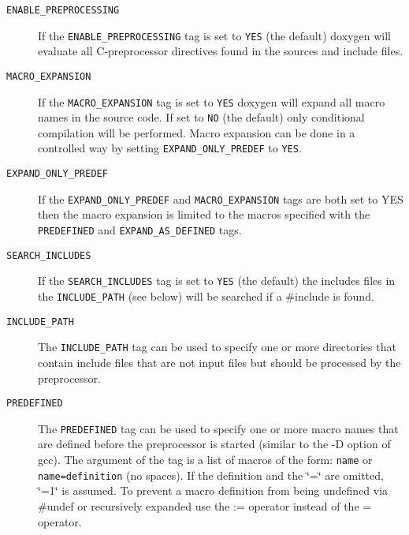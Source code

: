 \label{config_cfg_enable_preprocessing}
\hypertarget{config_cfg_enable_preprocessing}{}
 \begin{description}
\item[{\tt ENABLE\_\-PREPROCESSING} ] If the {\tt ENABLE\_\-PREPROCESSING} tag is set to {\tt YES} (the default) doxygen will evaluate all C-preprocessor directives found in the sources and include files.

\label{config_cfg_macro_expansion}
\hypertarget{config_cfg_macro_expansion}{}
 \item[{\tt MACRO\_\-EXPANSION} ] If the {\tt MACRO\_\-EXPANSION} tag is set to {\tt YES} doxygen will expand all macro names in the source code. If set to {\tt NO} (the default) only conditional compilation will be performed. Macro expansion can be done in a controlled way by setting {\tt EXPAND\_\-ONLY\_\-PREDEF} to {\tt YES}.

\label{config_cfg_expand_only_predef}
\hypertarget{config_cfg_expand_only_predef}{}
 \item[{\tt EXPAND\_\-ONLY\_\-PREDEF} ] If the {\tt EXPAND\_\-ONLY\_\-PREDEF} and {\tt MACRO\_\-EXPANSION} tags are both set to YES then the macro expansion is limited to the macros specified with the {\tt PREDEFINED} and {\tt EXPAND\_\-AS\_\-DEFINED} tags.

\label{config_cfg_search_includes}
\hypertarget{config_cfg_search_includes}{}
 \item[{\tt SEARCH\_\-INCLUDES} ] If the {\tt SEARCH\_\-INCLUDES} tag is set to {\tt YES} (the default) the includes files in the {\tt INCLUDE\_\-PATH} (see below) will be searched if a \#include is found.

\label{config_cfg_include_path}
\hypertarget{config_cfg_include_path}{}
 \item[{\tt INCLUDE\_\-PATH} ] The {\tt INCLUDE\_\-PATH} tag can be used to specify one or more directories that contain include files that are not input files but should be processed by the preprocessor.

\label{config_cfg_predefined}
\hypertarget{config_cfg_predefined}{}
 \item[{\tt PREDEFINED} ] The {\tt PREDEFINED} tag can be used to specify one or more macro names that are defined before the preprocessor is started (similar to the -D option of gcc). The argument of the tag is a list of macros of the form: {\tt name} or {\tt name=definition} (no spaces). If the definition and the \char`\"{}=\char`\"{} are omitted, \char`\"{}=1\char`\"{} is assumed. To prevent a macro definition from being undefined via \#undef or recursively expanded use the := operator instead of the = operator.


\end{description}

